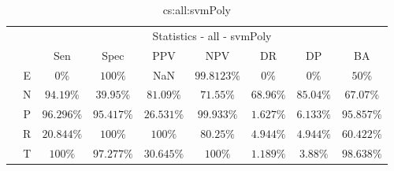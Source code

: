 \begin{table}[!ht]
	\centering
	\begin{tabular}{|c|c|c|c|c|c|c|c|c|}
		\cline{3-9}
		\multicolumn{2}{c|}{} & \multicolumn{7}{c|}{Statistics - all - svmPoly} \\ \cline{3-9}
		\multicolumn{2}{c|}{} & Sen & Spec & PPV & NPV & DR & DP & BA \\ \hline
		\multirow{5}{*}{\rotatebox{90}{Class}} & E & $0\%$ & $100\%$ & NaN & $99.8123\%$ & $0\%$ & $0\%$ & $50\%$ \\ \cline{2-9}
		 & N & $94.19\%$ & $39.95\%$ & $81.09\%$ & $71.55\%$ & $68.96\%$ & $85.04\%$ & $67.07\%$ \\ \cline{2-9}
		 & P & $96.296\%$ & $95.417\%$ & $26.531\%$ & $99.933\%$ & $1.627\%$ & $6.133\%$ & $95.857\%$ \\ \cline{2-9}
		 & R & $20.844\%$ & $100\%$ & $100\%$ & $80.25\%$ & $4.944\%$ & $4.944\%$ & $60.422\%$ \\ \cline{2-9}
		 & T & $100\%$ & $97.277\%$ & $30.645\%$ & $100\%$ & $1.189\%$ & $3.88\%$ & $98.638\%$ \\ \hline
	\end{tabular}
	\caption{cs:all:svmPoly}
	\label{tab:cs:all:svmPoly}
\end{table}
